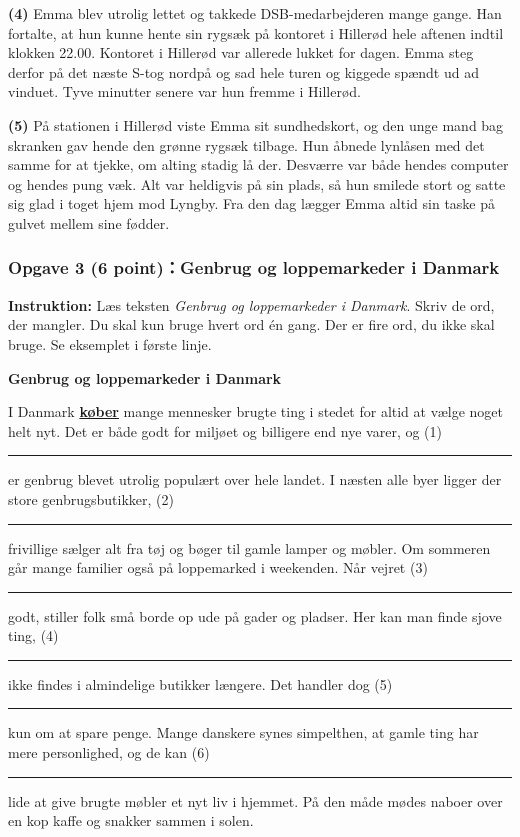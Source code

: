 \textbf{(4)} Emma blev utrolig lettet og takkede DSB-medarbejderen mange gange. Han fortalte, at hun kunne hente sin rygsæk på kontoret i Hillerød hele aftenen indtil klokken 22.00. Kontoret i Hillerød var allerede lukket for dagen. Emma steg derfor på det næste S-tog nordpå og sad hele turen og kiggede spændt ud ad vinduet. Tyve minutter senere var hun fremme i Hillerød.

\textbf{(5)} På stationen i Hillerød viste Emma sit sundhedskort, og den unge mand bag skranken gav hende den grønne rygsæk tilbage. Hun åbnede lynlåsen med det samme for at tjekke, om alting stadig lå der. Desværre var både hendes computer og hendes pung væk. Alt var heldigvis på sin plads, så hun smilede stort og satte sig glad i toget hjem mod Lyngby. Fra den dag lægger Emma altid sin taske på gulvet mellem sine fødder.

\subsubsection*{Opgave 3 (6 point)：Genbrug og loppemarkeder i Danmark}

\textbf{Instruktion:} Læs teksten \textit{Genbrug og loppemarkeder i Danmark}. Skriv de ord, der mangler. Du skal kun bruge hvert ord én gang. Der er fire ord, du ikke skal bruge. Se eksemplet i første linje.

\vspace{0.3em}
\textbf{\color{NCDNavy}Genbrug og loppemarkeder i Danmark}

\vspace{0.2em}
I Danmark \underline{\textbf{køber}} mange mennesker brugte ting i stedet for altid at vælge noget helt nyt. Det er både godt for miljøet og billigere end nye varer, og (1)\ \rule{2.1cm}{0.4pt} er genbrug blevet utrolig populært over hele landet. I næsten alle byer ligger der store genbrugsbutikker, (2)\ \rule{2.1cm}{0.4pt} frivillige sælger alt fra tøj og bøger til gamle lamper og møbler. Om sommeren går mange familier også på loppemarked i weekenden. Når vejret (3)\ \rule{2.1cm}{0.4pt} godt, stiller folk små borde op ude på gader og pladser. Her kan man finde sjove ting, (4)\ \rule{2.1cm}{0.4pt} ikke findes i almindelige butikker længere. Det handler dog (5)\ \rule{2.1cm}{0.4pt} kun om at spare penge. Mange danskere synes simpelthen, at gamle ting har mere personlighed, og de kan (6)\ \rule{2.1cm}{0.4pt} lide at give brugte møbler et nyt liv i hjemmet. På den måde mødes naboer over en kop kaffe og snakker sammen i solen.

